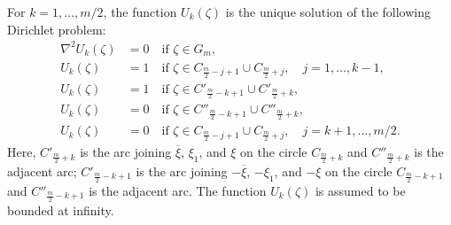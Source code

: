 For $k=1,\ldots,m/2$, the function $U_k(\zeta)$ is the unique solution of the following Dirichlet problem:
\begin{subequations}\label{eq:bdv-U0}
	\begin{align}
	\label{eq:U-Lap}
	\nabla^2 U_k(\zeta) &= 0 \quad \mbox{if }\zeta\in G_m, \\
	\label{eq:U-m}
	U_k(\zeta)&= 1 \quad \mbox{if }\zeta\in C_{\frac{m}{2}-j+1}\cup C_{\frac{m}{2}+j}, \quad j=1,\ldots,k-1, \\
	\label{eq:U-k'}
	U_k(\zeta)&= 1 \quad \mbox{if }\zeta\in C'_{\frac{m}{2}-k+1}\cup C'_{\frac{m}{2}+k},  \\
	\label{eq:U-k''}
	U_k(\zeta)&= 0 \quad \mbox{if }\zeta\in C''_{\frac{m}{2}-k+1}\cup C''_{\frac{m}{2}+k},  \\
	\label{eq:U-p}
	U_k(\zeta)&= 0 \quad \mbox{if }\zeta\in C_{\frac{m}{2}-j+1}\cup C_{\frac{m}{2}+j}, \quad j=k+1,\ldots,m/2. 
	\end{align}
\end{subequations}
Here, $C'_{\frac{m}{2}+k}$ is the arc joining $\overline{\xi}$, $\xi_1$, and $\xi$ on the circle $C_{\frac{m}{2}+k}$ and $C''_{\frac{m}{2}+k}$ is the adjacent arc; $C'_{\frac{m}{2}-k+1}$ is the arc joining $-\overline{\xi}$, $-\xi_1$, and $-\xi$ on the circle $C_{\frac{m}{2}-k+1}$ and $C''_{\frac{m}{2}-k+1}$ is the adjacent arc. The function $U_k(\zeta)$ is assumed to be bounded at infinity.

